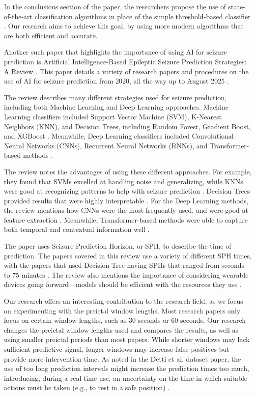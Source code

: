 \documentclass[conference]{IEEEtran}
\begin{document}
In the conclusions section of the paper, the researchers propose the use of state-of-the-art classification algorithms in place of the simple threshold-based classifier \cite{b10}. Our research aims to achieve this goal, by using more modern algorithms that are both efficient and accurate.

Another such paper that highlights the importance of using AI for seizure prediction is Artificial Intelligence-Based Epileptic Seizure Prediction Strategies: A Review \cite{b11}. This paper details a variety of research papers and procedures on the use of AI for seizure prediction from 2020, all the way up to August 2025 \cite{b11}.

The review describes many different strategies used for seizure prediction, including both Machine Learning and Deep Learning approaches. Machine Learning classifiers included Support Vector Machine (SVM), K-Nearest Neighbors (KNN), and Decision Trees, including Random Forest, Gradient Boost, and XGBoost \cite{b11}. Meanwhile, Deep Learning classifiers included Convolutional Neural Networks (CNNs), Recurrent Neural Networks (RNNs), and Transformer-based methods \cite{b11}.

The review notes the advantages of using these different approaches. For example, they found that SVMs excelled at handling noise and generalizing, while KNNs were good at recognizing patterns to help with seizure prediction \cite{b11}. Decision Trees provided results that were highly interpretable \cite{b11}. For the Deep Learning methods, the review mentions how CNNs were the most frequently used, and were good at feature extraction \cite{b11}. Meanwhile, Transformer-based methods were able to capture both temporal and contextual information well \cite{b11}.

The paper uses Seizure Prediction Horizon, or SPH, to describe the time of prediction. The papers covered in this review use a variety of different SPH times, with the papers that used Decision Tree having SPHs that ranged from seconds to 75 minutes \cite{b11}. The review also mentions the importance of considering wearable devices going forward---models should be efficient with the resources they use \cite{b11}.

Our research offers an interesting contribution to the research field, as we focus on experimenting with the preictal window lengths. Most research papers only focus on certain window lengths, such as 30 seconds or 60 seconds. Our research changes the preictal window lengths used and compares the results, as well as using smaller preictal periods than most papers. While shorter windows may lack sufficient predictive signal, longer windows may increase false positives but provide more intervention time. As noted in the Detti et al. dataset paper, the use of too long prediction intervals might increase the prediction times too much, introducing, during a real-time use, an uncertainty on the time in which suitable actions must be taken (e.g., to rest in a safe position) \cite{b10}.
\end{document}

